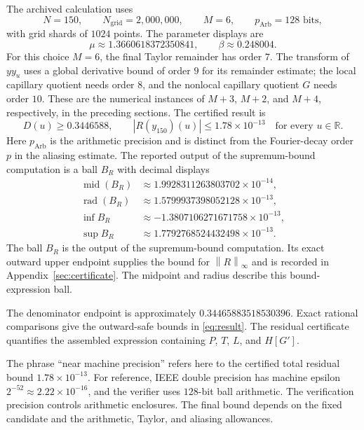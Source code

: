 \documentclass[11pt]{article}
\numberwithin{equation}{section}
\newcommand{\norm}[1]{\left\|#1\right\|_{\infty}}
\newcommand{\Ngrid}{N_{\mathrm{grid}}}
\begin{document}
The archived calculation uses
\begin{equation}
 N=150,\qquad\Ngrid=2{,}000{,}000,\qquad M=6,\qquad
 p_{\mathrm{Arb}}=128\text{ bits},
\end{equation}
with grid shards of $1024$ points. The parameter displays are
\begin{equation}
 \mu\approx1.3660618372350841,\qquad\beta\approx0.248004.
 \label{eq:parameters}
\end{equation}
For this choice $M=6$, the final Taylor remainder has order $7$. The
transform of $yy_u$ uses a global derivative bound of order $9$ for its
remainder estimate; the local capillary quotient needs order $8$, and the
nonlocal capillary quotient $G$ needs order $10$. These are the numerical
instances of $M+3$, $M+2$, and $M+4$, respectively, in the preceding
sections. The certified result is
\begin{equation}
 \boxed{D(u)\geq0.3446588,\qquad
 |R(y_{150})(u)|\leq1.78\times10^{-13}
 \quad\text{for every }u\in\mathbb R.}
 \label{eq:result}
\end{equation}
Here $p_{\mathrm{Arb}}$ is the
arithmetic precision and is distinct from the Fourier-decay order $p$
in the aliasing estimate.
The reported output of the supremum-bound computation is a ball $B_R$
with decimal displays
\begin{align}
 \operatorname{mid}(B_R)&\approx1.9928311263803702\times10^{-14},\\
 \operatorname{rad}(B_R)&\approx1.5799937398052128\times10^{-13},\\
 \inf B_R&\approx-1.3807106271671758\times10^{-13},\\
 \sup B_R&\approx1.7792768524432498\times10^{-13}.
 \label{eq:reported-ball}
\end{align}
The ball $B_R$ is the output of the supremum-bound computation. Its exact
outward upper endpoint supplies the bound for $\norm{R}$ and is recorded
in Appendix~\ref{sec:certificate}. The midpoint and radius describe this
bound-expression ball.

The denominator endpoint is approximately
$0.34465883518530396$. Exact rational comparisons give the outward-safe
bounds in \eqref{eq:result}. The residual certificate quantifies the
assembled expression containing $P$, $T$, $L$, and $H[G']$.

The phrase ``near machine precision'' refers here to the certified total
residual bound $1.78\times10^{-13}$. For reference, IEEE double precision
has machine epsilon $2^{-52}\approx2.22\times10^{-16}$, and the verifier
uses $128$-bit ball arithmetic. The verification precision controls
arithmetic enclosures. The final bound depends on the fixed candidate
and the arithmetic, Taylor, and aliasing allowances.
\end{document}
